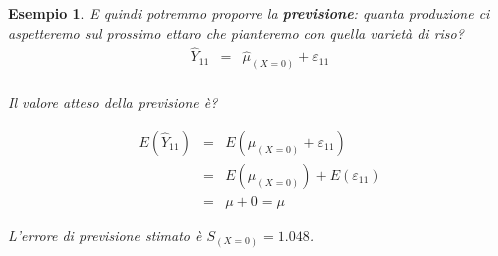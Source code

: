 \documentclass[
  11pt,
]{book}
\theoremstyle{mytheoremstyle}
\theoremstyle{mydefstyle}
\newtheorem{example}{{Esempio}}[section]
\begin{document}
\begin{example}
E quindi potremmo proporre la \textbf{previsione}:
quanta produzione ci aspetteremo sul prossimo ettaro che pianteremo con quella varietà di riso?
\begin{eqnarray*}
\hat Y_{11}&=&\hat\mu_{(X=0)}+\varepsilon_{11}\\
\end{eqnarray*}

Il valore atteso della previsione è?

\begin{eqnarray*} 
E(\hat Y_{11}) &=& E(\hat\mu_{(X=0)} + \varepsilon_{11}) \\ &=& E(\hat\mu_{(X=0)}) + E(\varepsilon_{11}) \\ &=& \mu + 0 = \mu 
\end{eqnarray*}

L'errore di previsione stimato è \(S_{(X=0)}=1.048\).
\end{example}
\end{document}
